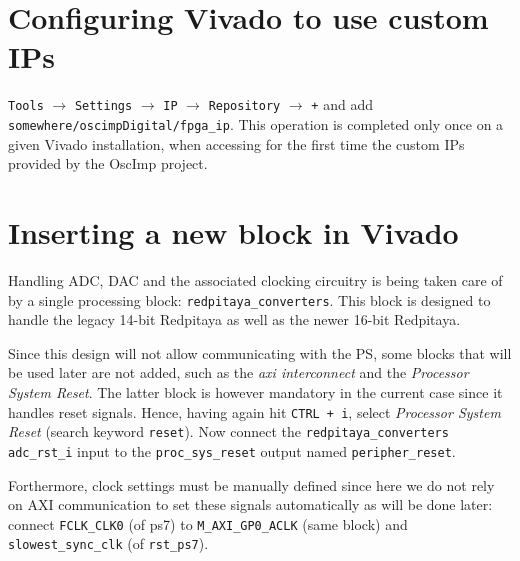 \documentclass[10pt,oneside]{article}
\begin{document}
\noindent{}

\section{Configuring Vivado to use custom IPs}

{\tt Tools} $\rightarrow$ {\tt Settings} $\rightarrow$ {\tt IP} 
$\rightarrow$ {\tt Repository} $\rightarrow$ {\tt +} and add
{\tt somewhere/oscimpDigital/fpga\_ip}. This operation is completed only once on a given
Vivado installation, when accessing for the first time the custom IPs provided by
the OscImp project.

\section{Inserting a new block in Vivado}

Handling ADC, DAC and the associated clocking circuitry is being taken care
of by a single processing block: {\tt redpitaya\_converters}. This block is designed
to handle the legacy 14-bit Redpitaya as well as the newer 16-bit Redpitaya.

Since this design will not allow communicating with the PS, some blocks that will
be used later are not added, such as the {\em axi interconnect} and the
{\em Processor System Reset}. The latter block is however mandatory in the current case
since it handles reset signals. Hence, having again hit {\tt CTRL + i}, select 
{\em Processor System Reset} (search keyword {\tt reset}). Now connect the {\tt redpitaya\_converters}
{\tt adc\_rst\_i} input to the {\tt proc\_sys\_reset} output named {\tt peripher\_reset}.

Forthermore, clock settings must be manually defined since here we do not rely on AXI
communication to set these signals automatically as will be done later:
connect {\tt FCLK\_CLK0} (of ps7) to {\tt M\_AXI\_GP0\_ACLK} (same block) and 
{\tt slowest\_sync\_clk} (of {\tt rst\_ps7}).
\end{document}
